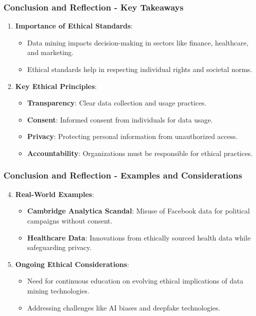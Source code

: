 \documentclass[aspectratio=169]{beamer}
\begin{document}
\begin{frame}[fragile]
  \frametitle{Conclusion and Reflection - Key Takeaways}
  \begin{enumerate}
    \item \textbf{Importance of Ethical Standards}:
      \begin{itemize}
        \item Data mining impacts decision-making in sectors like finance, healthcare, and marketing.
        \item Ethical standards help in respecting individual rights and societal norms.
      \end{itemize}
    
    \item \textbf{Key Ethical Principles}:
      \begin{itemize}
        \item \textbf{Transparency}: Clear data collection and usage practices.
        \item \textbf{Consent}: Informed consent from individuals for data usage.
        \item \textbf{Privacy}: Protecting personal information from unauthorized access.
        \item \textbf{Accountability}: Organizations must be responsible for ethical practices.
      \end{itemize}
  \end{enumerate}
\end{frame}

\begin{frame}[fragile]
  \frametitle{Conclusion and Reflection - Examples and Considerations}
  \begin{enumerate}
    \setcounter{enumi}{3}
    \item \textbf{Real-World Examples}:
      \begin{itemize}
        \item \textbf{Cambridge Analytica Scandal}: Misuse of Facebook data for political campaigns without consent.
        \item \textbf{Healthcare Data}: Innovations from ethically sourced health data while safeguarding privacy.
      \end{itemize}
    
    \item \textbf{Ongoing Ethical Considerations}:
      \begin{itemize}
        \item Need for continuous education on evolving ethical implications of data mining technologies.
        \item Addressing challenges like AI biases and deepfake technologies.
      \end{itemize}
  \end{enumerate}
\end{frame}
\end{document}

